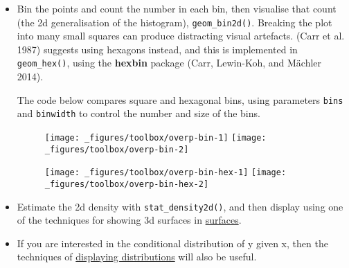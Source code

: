 \begin{itemize}
\item
  Bin the points and count the number in each bin, then visualise that
  count (the 2d generalisation of the histogram),
  \texttt{geom\_bin2d()}. Breaking the plot into many small squares can
  produce distracting visual artefacts. (Carr et al. 1987) suggests
  using hexagons instead, and this is implemented in
  \texttt{geom\_hex()}, using the \textbf{hexbin} package (Carr,
  Lewin-Koh, and Mächler 2014). 

  The code below compares square and hexagonal bins, using parameters
  \texttt{bins} and \texttt{binwidth} to control the number and size of
  the bins.  
   

\begin{Shaded}
\begin{Highlighting}[]
\OperatorTok{+}\StringTok{ }\NormalTok{()}
\OperatorTok{+}\StringTok{ }\NormalTok{(} \NormalTok{)}
\end{Highlighting}
\end{Shaded}

  \begin{figure}[H]
    \texttt{[image: \_figures/toolbox/overp-bin-1]}%
    \texttt{[image: \_figures/toolbox/overp-bin-2]}
  \end{figure}

\begin{Shaded}
\begin{Highlighting}[]
\OperatorTok{+}\StringTok{ }\NormalTok{()}
\OperatorTok{+}\StringTok{ }\NormalTok{(} \NormalTok{)}
\end{Highlighting}
\end{Shaded}

  \begin{figure}[H]
    \texttt{[image: \_figures/toolbox/overp-bin-hex-1]}%
    \texttt{[image: \_figures/toolbox/overp-bin-hex-2]}
  \end{figure}
\item
  Estimate the 2d density with \texttt{stat\_density2d()}, and then
  display using one of the techniques for showing 3d surfaces in
  \protect\hyperlink{sec:surface}{surfaces}.
\item
  If you are interested in the conditional distribution of y given x,
  then the techniques of \protect\hyperlink{sub:distribution}{displaying
  distributions} will also be useful.
\end{itemize}

